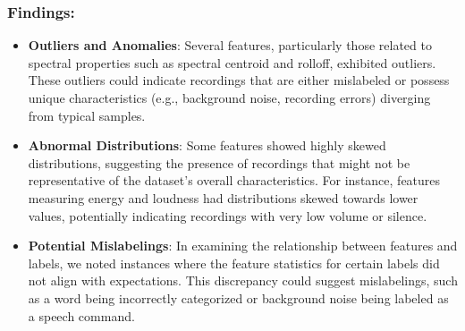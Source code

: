 \subsubsection{Findings:}

\begin{itemize}
    \item \textbf{Outliers and Anomalies}: Several features, particularly those related to spectral properties such as spectral centroid and rolloff, exhibited outliers. These outliers could indicate recordings that are either mislabeled or possess unique characteristics (e.g., background noise, recording errors) diverging from typical samples.
    \item \textbf{Abnormal Distributions}: Some features showed highly skewed distributions, suggesting the presence of recordings that might not be representative of the dataset's overall characteristics. For instance, features measuring energy and loudness had distributions skewed towards lower values, potentially indicating recordings with very low volume or silence.
    \item \textbf{Potential Mislabelings}: In examining the relationship between features and labels, we noted instances where the feature statistics for certain labels did not align with expectations. This discrepancy could suggest mislabelings, such as a word being incorrectly categorized or background noise being labeled as a speech command.
\end{itemize}

